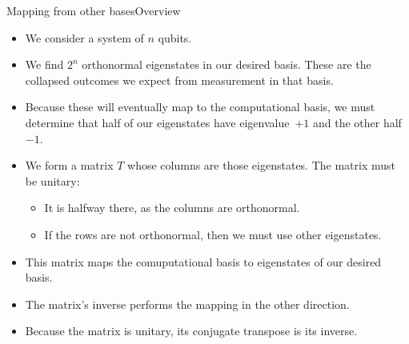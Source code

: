 \begin{frame}{Mapping from other bases}{Overview}

\begin{itemize}
    \item We consider a system of $n$ qubits.
    \item We find $2^n$ orthonormal eigenstates in our desired basis. These are the collapsed outcomes we expect from measurement in that basis.
    \item Because these will eventually map to the computational basis, we must determine that half of our eigenstates have eigenvalue~$+1$ and the other half~$-1$.
    \item We form a matrix $T$ whose columns are those eigenstates.  The matrix must be unitary:
    \begin{itemize}
        \item It is halfway there, as the columns are orthonormal.  
        \item If the rows are not orthonormal, then we must use other eigenstates.
    \end{itemize}
    \item This matrix maps the comuputational basis to eigenstates of our desired basis.
    \item The matrix's inverse performs the mapping in the other direction.
    \item Because the matrix is unitary, its conjugate transpose is its inverse.
\end{itemize}
\end{frame}

